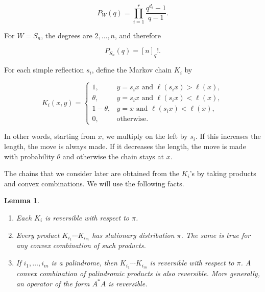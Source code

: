 \documentclass[11pt]{article}
\theoremstyle{plain}  %
\newtheorem{lemma}[theorem]{Lemma}
\begin{document}
$$
    P_W(q)
    =
    \prod_{i=1}^r\frac{q^{d_i}-1}{q-1}.
$$

For $W=S_n$, the degrees are $2,\ldots,n$, and therefore

$$
    P_{S_n}(q)=[n]_q!.
$$

For each simple reflection $s_i$, define the Markov chain $K_i$ by

$$
K_i(x,y)
=
\begin{cases}
1, & y=s_i x \text{ and } \ell(s_i x)>\ell(x),\\
\theta, & y=s_i x \text{ and } \ell(s_i x)<\ell(x),\\
1-\theta, & y=x \text{ and } \ell(s_i x)<\ell(x),\\
0, & \text{otherwise.}
\end{cases}
$$

In other words, starting from $x$, we multiply on the left by $s_i$. If this
increases the length, the move is always made. If it decreases the length, the
move is made with probability $\theta$ and otherwise the chain stays at $x$.

The chains that we consider later are obtained from the $K_i$'s by taking
products and convex combinations. We will use the following facts.

\begin{lemma}\label{lem:reversible}
\begin{enumerate}
\item Each $K_i$ is reversible with respect to $\pi$.

\item Every product $K_{i_1}\cdots K_{i_m}$ has stationary distribution
$\pi$. The same is true for any convex combination of such products.

\item If $i_1,\ldots,i_m$ is a palindrome, then
$K_{i_1}\cdots K_{i_m}$ is reversible with respect to $\pi$.
A convex combination of palindromic products is also reversible.
More generally, an operator of the form $A^*A$ is reversible.
\end{enumerate}
\end{lemma}
\end{document}
